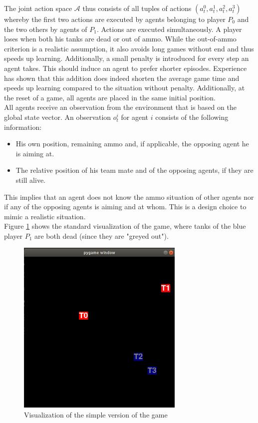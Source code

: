 The joint action space $\mathcal{A}$ thus consists of all tuples of actions $(a_t^0, a_t^1, a_t^2, a_t^3)$ whereby the first two actions are executed by agents belonging to player $P_0$ and the two others by agents of $P_1$. Actions are executed simultaneously. A player loses when both his tanks are dead or out of ammo. While the out-of-ammo criterion is a realistic assumption, it also avoids long games without end and thus speeds up learning. Additionally, a small penalty is introduced for every step an agent takes. This should induce an agent to prefer shorter episodes. Experience has shown that this addition does indeed shorten the average game time and speeds up learning compared to the situation without penalty. Additionally, at the reset of a game, all agents are placed in the same initial position.\\
All agents receive an observation from the environment that is based on the global state vector. An observation $o^i_t$ for agent $i$ consists of the following information:
\begin{itemize}
    \item His own position, remaining ammo and, if applicable, the opposing agent he is aiming at.
    \item The relative position of his team mate and of the opposing agents, if they are still alive.
\end{itemize}
This implies that an agent does not know the ammo situation of other agents nor if any of the opposing agents is aiming and at whom. This is a design choice to mimic a realistic situation.\\
Figure \ref{fig:game_visual} shows the standard visualization of the game, where tanks of the blue player $P_1$ are both dead (since they are "greyed out").

\begin{figure}[htp]
    \centering
    \includegraphics[width=8cm]{images/game_visual.png}
    \caption{Visualization of the simple version of the game}
    \label{fig:game_visual}
\end{figure}



